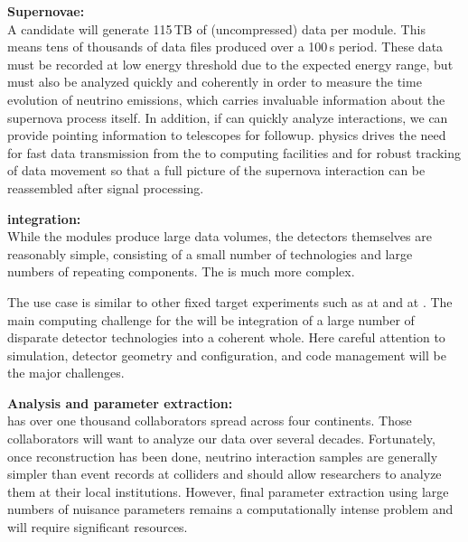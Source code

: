 \documentclass[../main-v1.tex]{subfiles}
\begin{document}
\begin{description}
\item{\bf Supernovae:\\}A %
 candidate will generate 115\,TB of (uncompressed) data per module. This means tens of thousands of data files produced over a 100\,s period. These data must be recorded at low energy threshold due to the expected energy range, but must also be analyzed quickly and coherently in order to measure the time evolution of neutrino emissions, which carries invaluable information about the supernova process itself. In addition, if  can quickly analyze  interactions, we can provide pointing information to telescopes for followup.  %
 physics drives the need for fast data transmission from the  to computing facilities and for robust tracking of data movement so that a full picture of the supernova interaction can be reassembled after signal processing. 

\item{\bf {} integration: \\}
While the  %
modules produce large data volumes, the detectors themselves are reasonably simple, consisting of a small number of technologies and large numbers of repeating components.  The  is much more complex. 

The  use case is similar to other fixed target experiments such as  at  and  at .  The main computing challenge for the  will be integration of a large number of disparate detector technologies into a coherent whole. Here careful attention to simulation, detector geometry and configuration, and code management will be the major challenges. 

\item{\bf Analysis and parameter extraction:\\}
 has over one thousand collaborators spread across four continents. Those collaborators will want to analyze our data over several decades. Fortunately, once reconstruction has been done, neutrino interaction samples are generally simpler than event records at colliders and should %
allow researchers to analyze them at their local institutions. However, final parameter extraction  using large numbers of nuisance parameters remains a computationally intense problem and will require significant resources. 



\end{description}
\end{document}
